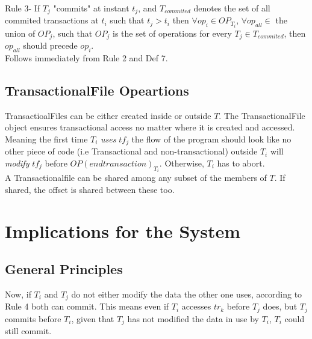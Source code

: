 \documentclass[a4paper, 11pt]{article}
\begin{document}




Rule 3- If $T_j$ "commits" at instant $t_j$, and $T_{commited}$ denotes the set of all commited transactions at $t_i$ such that $t_j > t_i$ then $\forall op_i \in OP_{T_i}$, $\forall op_{all} \in$ the union of $OP_j$, such that $OP_j$ is the set of operations  for every $T_j \in T_{commited}$, then $op_{all}$  should precede $op_{i}$.\\

Follows immediately from Rule 2 and Def 7. 

\subsection{TransactionalFile Opeartions}
TransactioalFiles can be either created inside or outside $T$. The TransactionalFile object ensures transactional access no matter where it is created and accessed. Meaning the first time $T_i$ \emph {uses} $tf_j$ the flow of the program should look like no other piece of code (i.e Transactional and non-transactional) outside $T_i$ will \emph {modify} $tf_j$ before $OP(endtransaction)_{T_i}$. Otherwise, $T_i$ has to abort. \\


A Transactionalfile can be shared among any subset of the members of $T$. If shared, the offset is shared between these too. 

\section{Implications for the System}

\subsection{General Principles}
Now, if $T_i$ and $T_j$ do not either modify the data the other one uses, according to Rule 4 both can commit. This means even if $T_i$ accesses $tr_k$ before $T_j$ does, but $T_j$ commits before $T_i$, given that $T_j$ has not modified the data in use by $T_i$, $T_i$ could still commit. \\
\end{document}
